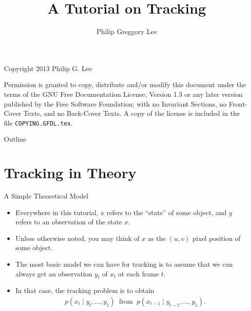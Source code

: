 \documentclass{beamer}
\title{A Tutorial on Tracking}
\author{Philip Greggory Lee}
\institute{
 Electrical Engineering and Computer Science\\
 Northwestern University\\
 Evanston, IL 60208
}
\begin{document}
\begin{frame}
 \titlepage
\end{frame}

\begin{frame}{Copyright 2013 Philip G. Lee}
 \begin{center}
 Permission is granted to copy, distribute and/or modify this document
 under the terms of the GNU Free Documentation License, Version 1.3
 or any later version published by the Free Software Foundation;
 with no Invariant Sections, no Front-Cover Texts, and no Back-Cover Texts.
 A copy of the license is included in the file \texttt{COPYING.GFDL.tex}.
 \end{center}
\end{frame}

\begin{frame}{Outline}
 \tableofcontents
\end{frame}
\addtocounter{framenumber}{-1}

\section{Tracking in Theory}%

\begin{frame}{A Simple Theoretical Model}
 \begin{itemize}
  \item Everywhere in this tutorial, $x$ refers to the ``state'' of some object,
        and $y$ refers to an observation of the state $x$.
  \item Unless otherwise noted, you may think of $x$ as the $(u,v)$ pixel position
        of some object.
  \item The most basic model we can have for tracking is to assume that we can
        always get an observation $y_t$ of $x_t$ at each frame $t$.
  \item In that case, the tracking problem is to obtain
  \begin{align}
   &p(x_t \mid y_t,\dotsc,y_1) \; \; \text{from} \; \; p(x_{t-1} \mid y_{t-1},\dotsc,y_1). \nonumber
  \end{align}
 \end{itemize}
\end{frame}
\end{document}
